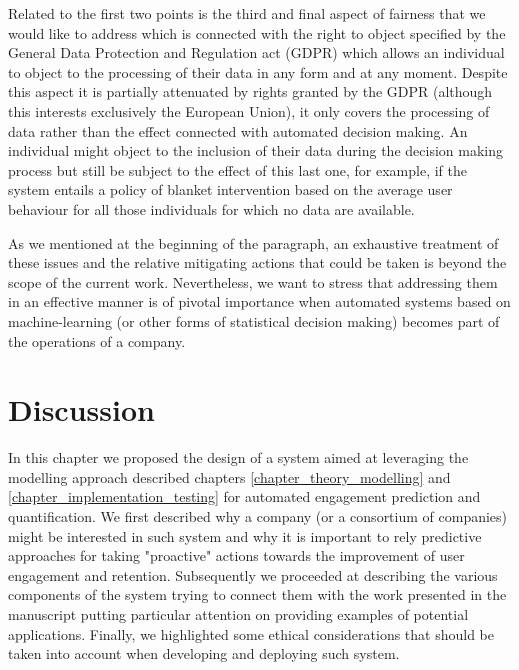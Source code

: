 Related to the first two points is the third and final aspect of fairness that we would like to address which is connected with the right to object specified by the General Data Protection and Regulation act (GDPR) \cite{EUdataregulations2018} which allows an individual to object to the processing of their data in any form and at any moment. Despite this aspect it is partially attenuated by rights granted by the GDPR (although this interests exclusively the European Union), it only covers the processing of data rather than the effect connected with automated decision making. An individual might object to the inclusion of their data during the decision making process but still be subject to the effect of this last one, for example, if the system entails a policy of blanket intervention based on the average user behaviour for all those individuals for which no data are available.

As we mentioned at the beginning of the paragraph, an exhaustive treatment of these issues and the relative mitigating actions that could be taken is beyond the scope of the current work. Nevertheless, we want to stress that addressing them in an effective manner is of pivotal importance when automated systems based on machine-learning (or other forms of statistical decision making) becomes part of the operations of a company.

\section{Discussion}
In this chapter we proposed the design of a system aimed at leveraging the modelling approach described chapters \ref{chapter_theory_modelling} and \ref{chapter_implementation_testing} for automated engagement prediction and quantification. We first described why a company (or a consortium of companies) might be interested in such system and why it is important to rely predictive approaches for taking "proactive" actions towards the improvement of user engagement and retention. Subsequently we proceeded at describing the various components of the system trying to connect them with the work presented in the manuscript putting particular attention on providing examples of potential applications. Finally, we highlighted some ethical considerations that should be taken into account when developing and deploying such system. 

